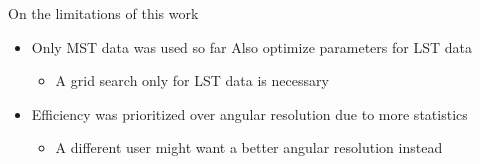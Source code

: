 \begin{frame}{On the limitations of this work}
    \begin{itemize}
        \item Only MST data was used so far \rightarrow{} Also optimize parameters for LST data
        \begin{itemize}
            \item [\rightarrow] A grid search only for LST data is necessary
        \end{itemize}
        \setlength\itemsep{1em}
        \item Efficiency was prioritized over angular resolution due to more statistics
        \begin{itemize}
            \item [\rightarrow] A different user might want a better angular resolution instead
        \end{itemize}
    \end{itemize}
\end{frame}

